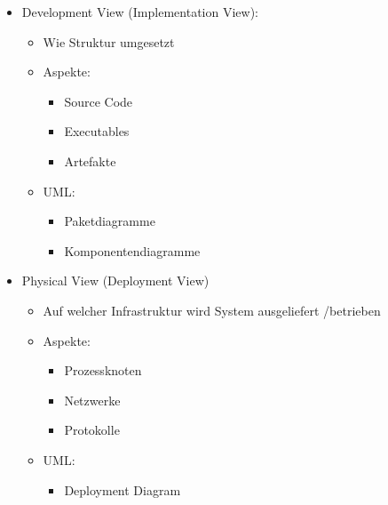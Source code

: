 \documentclass[../ZF_SWEN1.tex]{subfiles}
\begin{document}
\begin{itemize}
	\item Development View (Implementation View):
	\begin{itemize}
			\item Wie Struktur umgesetzt
			\item Aspekte: 
			\begin{itemize}
				\item Source Code
				\item Executables
				\item Artefakte
			\end{itemize}
			\item \colorbox{yellow!30}{UML:}
			\begin{itemize}
				\item Paketdiagramme
				\item Komponentendiagramme
				\end{itemize}
		\end{itemize}	
\end{itemize}


\begin{itemize}
	\item Physical View (Deployment View)
	\begin{itemize}
			\item Auf welcher Infrastruktur wird System ausgeliefert /betrieben
			\item Aspekte: 
			\begin{itemize}
				\item Prozessknoten
				\item Netzwerke
				\item Protokolle
			\end{itemize}
			\item \colorbox{yellow!30}{UML:}
			\begin{itemize}
				\item Deployment Diagram
			\end{itemize}
		\end{itemize}
\end{itemize}
\end{document}
